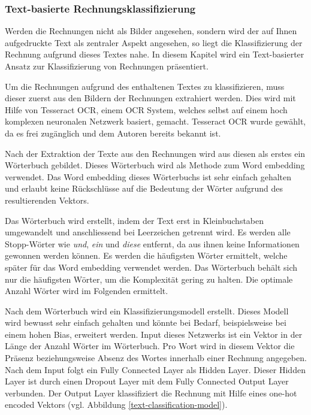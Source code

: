 \subsubsection{Text-basierte Rechnungsklassifizierung}
\label{chap:text-based-classification}

Werden die Rechnungen nicht als Bilder angesehen, sondern wird der auf Ihnen aufgedruckte Text als zentraler Aspekt angesehen, so liegt die Klassifizierung der Rechnung aufgrund dieses Textes nahe. In diesem Kapitel wird ein Text-basierter Ansatz zur Klassifizierung von Rechnungen präsentiert. 

Um die Rechnungen aufgrund des enthaltenen Textes zu klassifizieren, muss dieser zuerst aus den Bildern der Rechnungen extrahiert werden. Dies wird mit Hilfe von Tesseract OCR, einem OCR System, welches selbst auf einem hoch komplexen neuronalen Netzwerk basiert, gemacht. Tesseract OCR wurde gewählt, da es frei zugänglich und dem Autoren bereits bekannt ist. 

Nach der Extraktion der Texte aus den Rechnungen wird aus diesen als erstes ein Wörterbuch gebildet. Dieses Wörterbuch wird als Methode zum Word embedding verwendet. Das Word embedding dieses Wörterbuchs ist sehr einfach gehalten und erlaubt keine Rückschlüsse auf die Bedeutung der Wörter aufgrund des resultierenden Vektors.

Das Wörterbuch wird erstellt, indem der Text erst in Kleinbuchstaben umgewandelt und anschliessend bei Leerzeichen getrennt wird. Es werden alle Stopp-Wörter wie \textit{und}, \textit{ein} und \textit{diese} entfernt, da aus ihnen keine Informationen gewonnen werden können. Es werden die häufigsten Wörter ermittelt, welche später für das Word embedding verwendet werden. Das Wörterbuch behält sich nur die häufigsten Wörter, um die Komplexität gering zu halten. Die optimale Anzahl Wörter wird im Folgenden ermittelt.

Nach dem Wörterbuch wird ein Klassifizierungsmodell erstellt. Dieses Modell wird bewusst sehr einfach gehalten und könnte bei Bedarf, beispielsweise bei einem hohen Bias, erweitert werden. Input dieses Netzwerks ist ein Vektor in der Länge der Anzahl Wörter im Wörterbuch. Pro Wort wird in diesem Vektor die Präsenz beziehungsweise Absenz des Wortes innerhalb einer Rechnung angegeben. Nach dem Input folgt ein Fully Connected Layer als Hidden Layer. Dieser Hidden Layer ist durch einen Dropout Layer mit dem Fully Connected Output Layer verbunden. Der Output Layer klassifiziert die Rechnung mit Hilfe eines one-hot encoded Vektors (vgl. Abbildung \ref{text-classification-model}). 

